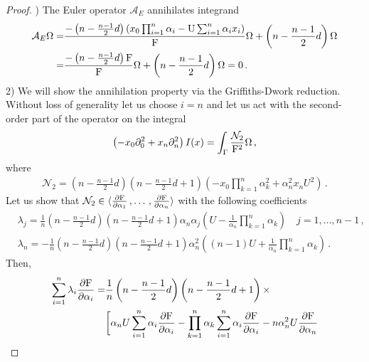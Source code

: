\documentclass[11pt]{article}
\begin{document}
\begin{proof}
\hfill {}) The Euler operator $\mathcal{A}_{E}$ annihilates integrand
\begin{align}
\begin{split}
\mathcal{A}_{E} \Omega =& \frac{-\left(n - \frac{n-1}{2}d\right)\left( x_{0}\prod_{i=1}^{n}\alpha_{i} - {\rm U}\sum_{i=1}^{n} \alpha_{i} x_{i} \right)}{{\rm F}}\Omega + \left(n - \frac{n-1}{2}d \right) \Omega  \\
=&\frac{-\left(n - \frac{n-1}{2}d \right){\rm F}}{{\rm F}}\Omega + \left(n - \frac{n-1}{2}d \right) \Omega = 0 \,. 
\end{split}
\end{align}
2) We will show the annihilation property via the Griffiths-Dwork reduction. Without loss of generality let us choose $i=n$ and let us act with the second-order part of the operator on the integral
\begin{align}
\left( - x_{0}\partial_{0}^{2} + x_{n} \partial_{n}^{2} \right) I(x) = \int_{\Gamma} \frac{\mathcal{N}_{2}}{{\rm F}^{2}} \Omega \,, 
\end{align}
where
\begin{align}
\mathcal{N}_{2} = \left(  n - \frac{n-1}{2}d \right) \left(  n - \frac{n-1}{2}d +1 \right)\left( -x_{0} \prod_{k=1}^{n}\alpha_{k}^{2} + \alpha_{n}^{2} x_{n} U^{2}  \right) \,.   
\end{align}
Let us show that $\mathcal{N}_{2} \in \langle \frac{\partial {\rm F}}{\partial \alpha_{1}} \,, \hdots \,, \frac{\partial {\rm F}}{\partial \alpha_{n}}  \rangle$ with the following coefficients
\begin{align}
&\lambda_{j} = \frac{1}{n}\left(  n - \frac{n-1}{2}d \right) \left(  n - \frac{n-1}{2}d +1 \right) \alpha_{n} \alpha_{j} \left( U - \frac{1}{\alpha_{n}}\prod_{k=1}^{n} \alpha_{k} \right) \quad j = 1, \hdots , n-1 \,, \\
&\lambda_{n} = -\frac{1}{n}\left(  n - \frac{n-1}{2}d \right) \left(  n - \frac{n-1}{2}d +1 \right) \alpha_{n}^{2}  \left( (n-1) U + \frac{1}{\alpha_{n}}\prod_{k=1}^{n} \alpha_{k} \right) \,.
\end{align}
Then,
\begin{align}
\begin{split}
\sum_{i=1}^{n} \lambda_{i} \frac{\partial {\rm F}}{\partial \alpha_{i}} =& \frac{1}{n}\left(  n - \frac{n-1}{2}d \right) \left(  n - \frac{n-1}{2}d +1 \right)\times \\  
&\bigg[
\alpha_{n} U \sum_{i=1}^{n}\alpha_{i} \frac{\partial {\rm F}}{\partial \alpha_{i}} - \prod_{k=1}^{n} \alpha_{k} \sum_{i=1}^{n}\alpha_{i} \frac{\partial {\rm F}}{\partial \alpha_{i}} - n \alpha_{n}^{2} U \frac{\partial {\rm F}}{\partial \alpha_{n}}

\end{split}
\end{align}
\end{proof}
\end{document}
